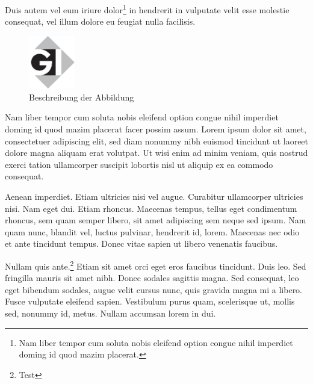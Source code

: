 \documentclass{akdai}
\theoremstyle{definition}
\begin{document}
Duis autem vel eum iriure dolor\footnote{Nam liber tempor cum soluta nobis eleifend option congue 
nihil imperdiet doming id quod mazim placerat.}  in hendrerit in vulputate velit esse molestie 
consequat, vel illum dolore eu feugiat nulla facilisis. 

\begin{figure}[htb]
  \begin{center}
    \includegraphics[width=2cm]{gilogo}
    \caption{\label{logo1}Beschreibung der Abbildung}
  \end{center}
\end{figure}

Nam liber tempor cum soluta nobis eleifend option congue nihil imperdiet doming id quod mazim 
placerat facer possim assum. Lorem ipsum dolor sit amet, consectetuer adipiscing elit, sed diam 
nonummy nibh euismod tincidunt ut laoreet dolore magna aliquam erat volutpat. Ut wisi enim ad minim 
veniam, quis nostrud exerci tation ullamcorper suscipit lobortis nisl ut aliquip ex ea commodo 
consequat. 




Aenean imperdiet. Etiam ultricies nisi vel augue.  Curabitur ullamcorper 
ultricies nisi. Nam eget dui. Etiam rhoncus. Maecenas tempus, tellus eget condimentum rhoncus, sem 
quam semper libero, sit amet adipiscing sem neque  sed ipsum. Nam quam nunc, blandit vel, luctus 
pulvinar, hendrerit id, lorem. Maecenas nec odio et ante tincidunt tempus. Donec vitae sapien ut 
libero venenatis faucibus.

Nullam quis ante.\footnote{Test} Etiam sit amet orci eget eros faucibus 
tincidunt. 
Duis leo. Sed fringilla mauris sit amet nibh. Donec sodales sagittis magna. Sed consequat, leo eget 
bibendum sodales, augue velit cursus nunc, quis gravida magna mi a libero. Fusce vulputate eleifend 
sapien. Vestibulum purus quam, scelerisque ut, mollis sed, nonummy id, metus. Nullam accumsan lorem 
in dui.
\end{document}
